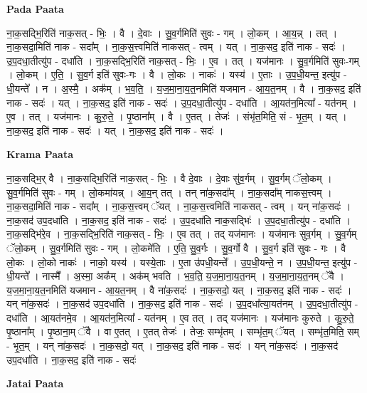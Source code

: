 \documentclass[17pt]{extarticle}
\begin{document}
\textbf{Pada Paata} \newline

ना॒क॒सद्भि॒रिति॑ नाक॒सत् - भिः॒ । वै । दे॒वाः । सु॒व॒र्गमिति॑ सुवः - गम् । लो॒कम् । आ॒य॒न्न् । तत् । ना॒क॒सदा॒मिति॑ नाक - सदा᳚म् । ना॒क॒स॒त्त्वमिति॑ नाकसत् - त्वम् । यत् । ना॒क॒सद॒ इति॑ नाक - सदः॑ । उ॒प॒दधा॒तीत्यु॑प - दधा॑ति । ना॒क॒सद्भि॒रिति॑ नाक॒सत् - भिः॒ । ए॒व । तत् । यज॑मानः । सु॒व॒र्गमिति॑ सुवः-गम् । लो॒कम् । ए॒ति॒ । सु॒व॒र्ग इति॑ सुवः-गः । वै । लो॒कः । नाकः॑ । यस्य॑ । ए॒ताः । उ॒प॒धी॒यन्त॒ इत्यु॑प - धी॒यन्ते᳚ । न । अ॒स्मै॒ । अक᳚म् । भ॒व॒ति॒ । य॒ज॒मा॒ना॒य॒त॒नमिति॑ यजमान - आ॒य॒त॒नम् । वै । ना॒क॒सद॒ इति॑ नाक - सदः॑ । यत् । ना॒क॒सद॒ इति॑ नाक - सदः॑ । उ॒प॒दधा॒तीत्यु॑प - दधा॑ति । आ॒यत॑न॒मित्या᳚ - यत॑नम् । ए॒व । तत् । यज॑मानः । कु॒रु॒ते॒ । पृ॒ष्ठाना᳚म् । वै । ए॒तत् । तेजः॑ । संभृ॑त॒मिति॒ सं - भृ॒त॒म् । यत् । ना॒क॒सद॒ इति॑ नाक - सदः॑ । यत् । ना॒क॒सद॒ इति॑ नाक - सदः॑ ।  \newline


\textbf{Krama Paata} \newline

ना॒क॒सद्भि॒र् वै । ना॒क॒सद्भि॒रिति॑ नाक॒सत् - भिः॒ । वै दे॒वाः । दे॒वाः सु॑व॒र्गम् । सु॒व॒र्गम् ॅलो॒कम् । सु॒व॒र्गमिति॑ सुवः - गम् । लो॒कमा॑यन्न् । आ॒य॒न् तत् । तन् ना॑क॒सदा᳚म् । ना॒क॒सदा᳚म् नाकस॒त्त्वम् । ना॒क॒सदा॒मिति॑ नाक - सदा᳚म् । ना॒क॒स॒त्त्वम् ॅयत् । ना॒क॒स॒त्त्वमिति॑ नाकसत् - त्वम् । यन् ना॑क॒सदः॑ । ना॒क॒सद॑ उप॒दधा॑ति । ना॒क॒सद॒ इति॑ नाक - सदः॑ । उ॒प॒दधा॑ति नाक॒सद्भिः॑ । उ॒प॒दधा॒तीत्यु॑प - दधा॑ति । ना॒क॒सद्भि॑रे॒व । ना॒क॒सद्भि॒रिति॑ नाक॒सत् - भिः॒ । ए॒व तत् । तद् यज॑मानः । यज॑मानः सुव॒र्गम् । सु॒व॒र्गम् ॅलो॒कम् । सु॒व॒र्गमिति॑ सुवः - गम् । लो॒कमे॑ति । ए॒ति॒ सु॒व॒र्गः । सु॒व॒र्गो वै । सु॒व॒र्ग इति॑ सुवः - गः । वै लो॒कः । लो॒को नाकः॑ । नाको॒ यस्य॑ । यस्ये॒ताः । ए॒ता उ॑पधी॒यन्ते᳚ । उ॒प॒धी॒यन्ते॒ न । उ॒प॒धी॒यन्त॒ इत्यु॑प - धी॒यन्ते᳚ । नास्मै᳚ । अ॒स्मा॒ अक᳚म् । अक॑म् भवति । भ॒व॒ति॒ य॒ज॒मा॒ना॒य॒त॒नम् । य॒ज॒मा॒ना॒य॒त॒नम् ॅवै । य॒ज॒मा॒ना॒य॒त॒नमिति॑ यजमान - आ॒य॒त॒नम् । वै ना॑क॒सदः॑ । ना॒क॒सदो॒ यत् । ना॒क॒सद॒ इति॑ नाक - सदः॑ । यन् ना॑क॒सदः॑ । ना॒क॒सद॑ उप॒दधा॑ति । ना॒क॒सद॒ इति॑ नाक - सदः॑ । उ॒प॒दधा᳚त्या॒यत॑नम् । उ॒प॒दधा॒तीत्यु॑प - दधा॑ति । आ॒यत॑नमे॒व । आ॒यत॑न॒मित्या᳚ - यत॑नम् । ए॒व तत् । तद् यज॑मानः । यज॑मानः कुरुते । कु॒रु॒ते॒ पृ॒ष्ठाना᳚म् । पृ॒ष्ठाना॒म् ॅवै । वा ए॒तत् । ए॒तत् तेजः॑ । तेजः॒ सम्भृ॑तम् । सम्भृ॑त॒म् ॅयत् । सम्भृ॑त॒मिति॒ सम् - भृ॒त॒म् । यन् ना॑क॒सदः॑ । ना॒क॒सदो॒ यत् । ना॒क॒सद॒ इति॑ नाक - सदः॑ । यन् ना॑क॒सदः॑ । ना॒क॒सद॑ उप॒दधा॑ति । ना॒क॒सद॒ इति॑ नाक - सदः॑ \newline

\textbf{Jatai Paata} \newline
\end{document}
